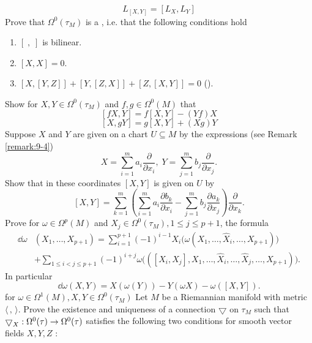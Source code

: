 \begin{enumerate}[label=\theexercise.\arabic*.,ref=\theexercise.\arabic*,leftmargin=2.7em]
    \[
      {L}_{[  X,Y]  } = [  {{L}_{X},{L}_{Y}}]
    \]
    Prove that ${\Omega }^{0}( {\tau }_{M})$ is a , i.e. that the following conditions hold
    \begin{enumerate}
      \item[(L1)] $[  {\;,\;}]$ is bilinear.
      \item[(L2)] $[  {X,X}] = 0$.
      \item[(L3)] $[  {X,[  {Y,Z}]  }]   + [  {Y,[  {Z,X}]  }]   + [  {Z,[  {X,Y}]  }] = 0$ ().
    \end{enumerate}
    Show for $X,Y \in  {\Omega }^{0}( {\tau }_{M})$ and $f,g \in  {\Omega }^{0}( M)$ that
    \[
      [  {{fX},Y}]   = f[  {X,Y}]  - ( {Yf}) X
    \]
    \[
      [  {X,{gY}}]   = g[  {X,Y}]   + ( {Xg}) Y
    \]
    Suppose $X$ and $Y$ are given on a chart $U \subseteq  M$ by the expressions (see Remark \ref{remark:9-4})
    \[
      X = \sum_{i=1}^{m}{a}_{i}\frac{\partial }{\partial {x}_{i}},\;Y = \sum_{{j = 1}}^{m}{b}_{j}\frac{\partial }{\partial {x}_{j}}.
    \]
    Show that in these coordinates $[  {X,Y}]$ is given on $U$ by
    \[
      [  {X,Y}]   = \sum_{{k = 1}}^{m}\left( {\sum_{i=1}^{m}{a}_{i}\frac{\partial {b}_{k}}{\partial {x}_{i}}- \sum_{{j = 1}}^{m}{b}_{j}\frac{\partial {a}_{k}}{\partial {x}_{j}}}\right) \frac{\partial }{\partial {x}_{k}}.
    \]
  \NewItem Prove for $\omega  \in  {\Omega }^{p}( M)$ and ${X}_{j} \in  {\Omega }^{0}( {\tau }_{M}),1 \leq  j \leq  p + 1$, the formula
    \[
      \begin{aligned}
        {\dd\omega } & ( {{X}_{1},\ldots,{X}_{p + 1}})  
          = \sum_{i=1}^{{p + 1}}{(-1) }^{i- 1}{X}_{i}\big( {\omega ( {{X}_{1},\ldots,{\widehat{X}}_{i},\ldots,{X}_{p + 1}}) }\big)\\
        & + \sum_{{1 \leq  i < j \leq  p + 1}}{(-1) }^{i + j}\omega \big( ( {[  {{X}_{i},{X}_{j}}] ,{X}_{1},\ldots,{\widehat{X}}_{i},\ldots,{\widehat{X}}_{j},\ldots,{X}_{p + 1}}) \big).
      \end{aligned}
    \]
    In particular
    \[
      {\dd\omega }( {X,Y})  = X( {\omega ( Y) }) - Y( {\omega X}) - \omega ( [  {X,Y}]  ).
    \]
    for $\omega  \in  {\Omega }^{1}( M),X,Y \in  {\Omega }^{0}( {\tau }_{M})$
  \NewItem Let $M$ be a Riemannian manifold with metric $\langle\,,\,\rangle$. Prove the existence and uniqueness of a connection $\bigtriangledown$ on ${\tau }_{M}$ such that ${ \bigtriangledown  }_{X} : {\Omega }^{0}( \tau )  \rightarrow  {\Omega }^{0}( \tau )$ satisfies the following two conditions for smooth vector fields $X,Y,Z$ :

\end{enumerate}
